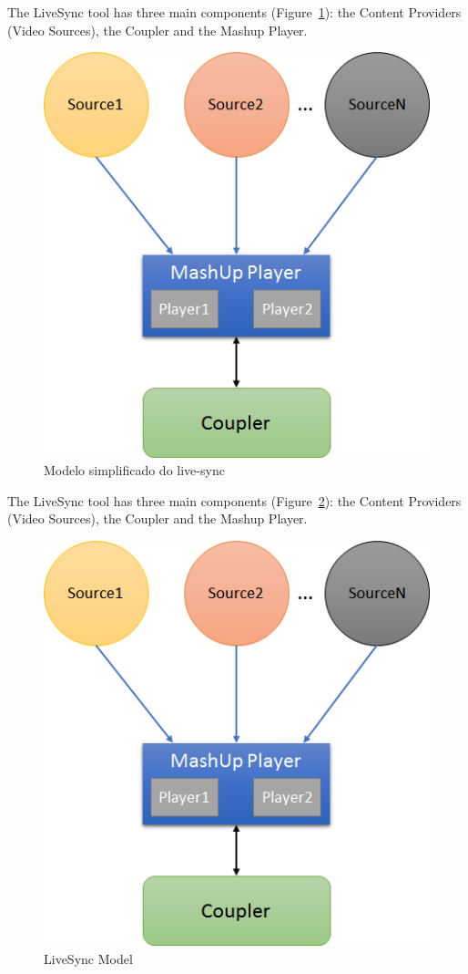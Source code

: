 The LiveSync tool has three main components (Figure~\ref{livesync}): the Content Providers (Video Sources), the Coupler and the Mashup Player.


\begin{figure}
	\centerline{\includegraphics[scale=0.4] {figure/arqchitecture}}
	\caption{Modelo simplificado do live-sync}
	\label{livesync}
\end{figure}




The LiveSync tool has three main components (Figure~\ref{live_arq}): the Content Providers (Video Sources), the Coupler and the Mashup Player.

\begin{figure}[h]
	\centerline{\includegraphics[scale=0.6] {figure/arqchitecture}}
	\caption{LiveSync Model}
	\label{live_arq}
\end{figure}


